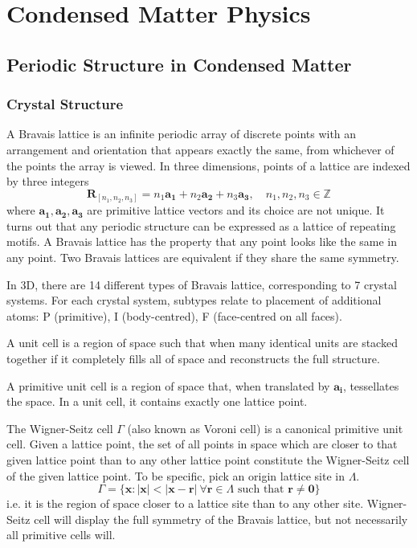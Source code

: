 \documentclass[a4paper]{article}
\begin{document}
\section{Condensed Matter Physics}
\cite{ashcroft1976solid,singleton2001band,simon2013oxford}
\subsection{Periodic Structure in Condensed Matter}
\subsubsection*{Crystal Structure \cite{ashcroft1976solid}}
\begin{defi}
A Bravais lattice is an infinite periodic array of discrete points with an arrangement and orientation that appears exactly the same, from whichever of the points the array is viewed. In three dimensions, points of a lattice are indexed by three integers
$$\mathbf{R}_{[n_1,n_2,n_3]}=n_1\mathbf{a_1}+n_2\mathbf{a_2}+n_3\mathbf{a_3},\quad n_1,n_2,n_3\in\mathbb{Z}$$ 
where $\mathbf{a_1},\mathbf{a_2},\mathbf{a_3}$ are primitive lattice vectors and its choice are not unique. It turns out that any periodic structure can be expressed as a lattice of repeating motifs. A Bravais lattice has the property that any point looks like the same in any point. Two Bravais lattices are equivalent if they share the same symmetry. 
\end{defi}
\begin{Note}
In 3D, there are 14 different types of Bravais lattice, corresponding to 7 crystal systems. For each crystal system, subtypes relate to placement of additional atoms: P (primitive), I (body-centred), F (face-centred on all faces).
\end{Note}
\begin{defi}
A unit cell is a region of space such that when many identical units are stacked together if it completely fills all of space and reconstructs the full structure.
\end{defi}
\begin{defi}
A primitive unit cell is a region of space that, when translated by $\mathbf{a_i}$, tessellates the space. In a unit cell, it contains exactly one lattice point.
\end{defi}
\begin{defi}
The Wigner-Seitz cell $\Gamma$ (also known as Voroni cell) is a canonical primitive unit cell. Given a lattice point, the set of all points in space which are closer to that given lattice point than to any other lattice point constitute the Wigner-Seitz cell of the given lattice point. To be specific, pick an origin lattice site in $\Lambda$.
$$\Gamma=\{\mathbf{x}:|\mathbf{x}|<|\mathbf{x}-\mathbf{r}|~\forall\mathbf{r}\in\Lambda\text{ such that }\mathbf{r}\neq\boldsymbol{0}\}$$
i.e. it is the region of space closer to a lattice site than to any other site. Wigner-Seitz cell will display the full symmetry of the Bravais lattice, but not necessarily all primitive cells will.
\end{defi}
\end{document}
